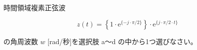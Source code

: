 時間領域複素正弦波

\[
z(t) =  \left \{ 1 \cdot \textrm{e}^{\{-j \cdot \pi/2 \}} \right \} \cdot \textrm{e}^{\{ j \cdot \pi/2 \cdot t \}}
\]

\bigskip
\noindent の角周波数 $w$ [rad/秒]を選択肢 a〜d の中から1つ選びなさい。

